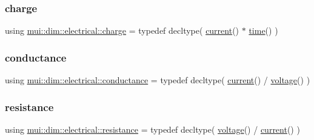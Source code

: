 \subsubsection{\texorpdfstring{charge}{charge}}
{\footnotesize\ttfamily using \hyperlink{namespacemui_1_1dim_1_1electrical_acd4b8cce75196ce05ff2879941d870df}{mui\+::dim\+::electrical\+::charge} = typedef decltype( \hyperlink{namespacemui_1_1dim_ac15a72100f3e57d6c9419fca5501b456}{current}() $\ast$ \hyperlink{namespacemui_1_1dim_a3d3a0014025f1c2c0dd7418791928500}{time}() )}

\mbox{\label{namespacemui_1_1dim_1_1electrical_a575b190ccda32c3b901b8fd44249c62e}} 
\subsubsection{\texorpdfstring{conductance}{conductance}}
{\footnotesize\ttfamily using \hyperlink{namespacemui_1_1dim_1_1electrical_a575b190ccda32c3b901b8fd44249c62e}{mui\+::dim\+::electrical\+::conductance} = typedef decltype( \hyperlink{namespacemui_1_1dim_ac15a72100f3e57d6c9419fca5501b456}{current}() / \hyperlink{namespacemui_1_1dim_1_1electrical_a028fd928ac1e20226332a4e793bac739}{voltage}() )}

\mbox{\label{namespacemui_1_1dim_1_1electrical_a86a4b6ba2ef40975afac4dd629e07d3b}} 
\subsubsection{\texorpdfstring{resistance}{resistance}}
{\footnotesize\ttfamily using \hyperlink{namespacemui_1_1dim_1_1electrical_a86a4b6ba2ef40975afac4dd629e07d3b}{mui\+::dim\+::electrical\+::resistance} = typedef decltype( \hyperlink{namespacemui_1_1dim_1_1electrical_a028fd928ac1e20226332a4e793bac739}{voltage}() / \hyperlink{namespacemui_1_1dim_ac15a72100f3e57d6c9419fca5501b456}{current}() )}

\mbox{\label{namespacemui_1_1dim_1_1electrical_a028fd928ac1e20226332a4e793bac739}} 
